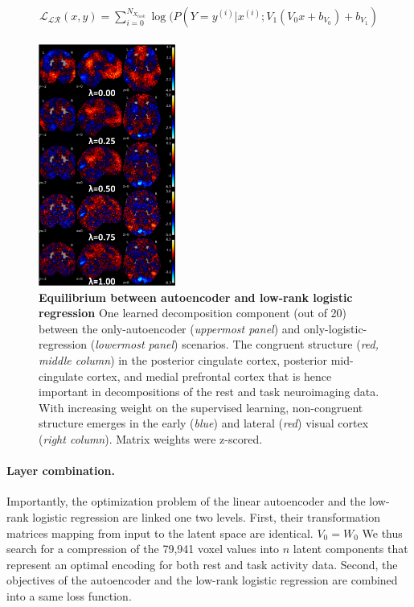 \documentclass{article} %
\begin{document}
\begin{eqnarray}
  \begin{split}
    {\mathcal{L_{LR}}}(x, y) = \sum_{i=0}^{N_{X_{task}}} \log(P(Y=y^{(i)}|x^{(i)}; V_1 (V_0 x + b_{V_0}) + b_{V_1})
\end{split}
\label{eq:lr_loss}
\end{eqnarray}

\begin{figure}
  \begin{center}
    \includegraphics[width=0.40\textwidth]{figures/figure3.png}
  \end{center}
  \caption {\textbf{Equilibrium between autoencoder and low-rank logistic regression}
  One learned decomposition component (out of 20) between the only-autoencoder
  (\textit{uppermost panel}) and only-logistic-regression
  (\textit{lowermost panel}) scenarios.
  The congruent structure (\textit{red, middle column})
  in the
  posterior cingulate cortex, posterior mid-cingulate cortex, and medial
  prefrontal cortex that is hence important in decompositions of the rest and
  task neuroimaging data. With increasing weight on the supervised learning,
  non-congruent structure emerges in the early (\textit{blue}) and
  lateral (\textit{red}) visual cortex
  (\textit{right column}). Matrix weights were z-scored.
  }
\end{figure}

\paragraph{Layer combination.}
Importantly, the optimization problem of the linear autoencoder
and the low-rank logistic regression
are linked one two levels. First, their transformation matrices mapping from
input to the latent space are identical.
    $V_0 = W_0$
We thus search for a compression of the 79,941 voxel values into $n$ latent
components that represent an optimal encoding for both
rest and task activity data.
Second, the objectives of the autoencoder and the low-rank
logistic regression are combined into a same loss function.
\end{document}
